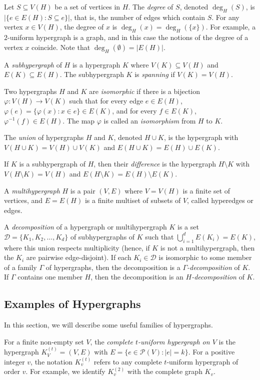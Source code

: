 Let $S \subseteq V(H)$ be a set of vertices in $H$. The {\em degree} of $S$,
denoted $\deg_H(S)$, is $|\{e \in E(H) : S \subseteq e\}|$, that is, the number
of edges which contain $S$.
For any vertex $x \in V(H)$, the degree of $x$ is $\deg_H(x) = \deg_H(\{x\})$.
For example, a $2$-uniform hypergraph is a graph, and in this case the notions
of the degree of a vertex $x$ coincide. Note that $\deg_H(\emptyset) = |E(H)|$.

A {\em subhypergraph} of $H$ is a hypergraph $K$ where $V(K) \subseteq V(H)$ and $E(K) \subseteq E(H)$. The subhypergraph $K$ is {\em spanning} if $V(K) = V(H)$.

Two hypergraphs $H$ and $K$ are {\em isomorphic} if there is a bijection
$\varphi : V(H) \to V(K)$ such that for every edge $e \in E(H)$,
$\varphi(e) = \{\varphi(x) : x \in e\} \in E(K)$, and for every
$f \in E(K)$, $\varphi^{-1}(f) \in E(H)$. The map $\varphi$ is called an {\em isomorphism} from $H$ to $K$.

The {\em union} of hypergraphs $H$ and $K$, denoted
$H \cup K$, is the hypergraph with $V(H \cup K) = V(H) \cup V(K)$ and
$E(H \cup K) = E(H) \cup E(K)$.

If $K$ is a subhypergraph of $H$, then their {\em difference}
is the hypergraph $H \setminus K$ with $V(H \setminus K) = V(H)$ and
$E(H \setminus K) = E(H) \setminus E(K)$.

A {\em multihypergraph} $H$ is a pair $(V, E)$ where $V = V(H)$ is a finite set
of vertices, and $E = E(H)$ is a finite multiset of subsets of $V$, called
hyperedges or edges.

A {\em decomposition} of a hypergraph or multihypergraph $K$ is a set $\mathcal{D} = \{K_1,
K_2, \ldots, K_d\}$ of subhypergraphs of $K$ such that
$\bigcup_{i=1}^d E(K_i) = E(K)$, where this union respects multiplicity (hence, if $K$ is not a multihypergraph, then the $K_i$ are pairwise edge-disjoint).
If each $K_i \in \mathcal{D}$ is isomorphic to some member
of a family $\Gamma$ of hypergraphs, then the decomposition is a {\em
$\Gamma$-decomposition} of $K$. If $\Gamma$ contains one member $H$, then the
decomposition is an {\em $H$-decomposition} of $K$.

\subsection{Examples of Hypergraphs}

In this section, we will describe some useful families of hypergraphs.

For a finite non-empty set $V$, the {\em complete $t$-uniform hypergraph on $V$}
is the hypergraph $K_V^{(t)} = (V, E)$ with $E = \{e \in \mathcal{P}(V) : |e| = k\}$.
For a positive integer $v$, the notation $K_v^{(t)}$ refers to any complete
$t$-uniform hypergraph of order $v$.
For example, we identify $K_v^{(2)}$ with the complete graph $K_v$.

